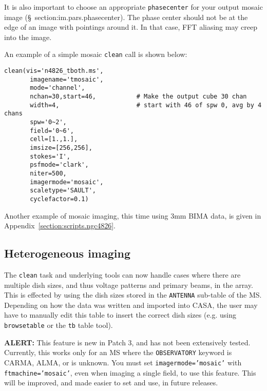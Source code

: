 It is also important to choose an appropriate {\tt phasecenter} for
your output mosaic image (\S~{section:im.pars.phasecenter}). The phase
center should not be at the edge of an image with pointings around
it. In that case, FFT aliasing may creep into the image. 


An example of a simple mosaic {\tt clean} call is shown below: 
\small
\begin{verbatim}
clean(vis='n4826_tboth.ms',        
       imagename='tmosaic',         
       mode='channel',
       nchan=30,start=46,           # Make the output cube 30 chan
       width=4,                     # start with 46 of spw 0, avg by 4 chans
       spw='0~2',
       field='0~6',
       cell=[1.,1.],
       imsize=[256,256],
       stokes='I',
       psfmode='clark',
       niter=500,
       imagermode='mosaic',
       scaletype='SAULT',
       cyclefactor=0.1)
\end{verbatim}
\normalsize

Another example of mosaic imaging, this time using 3mm BIMA data,
is given in Appendix~\ref{section:scripts.ngc4826}.

\subsection{Heterogeneous imaging}
\label{section:im.clean.hetero}

The {\tt clean} task and underlying tools can now handle cases where
there are multiple dish sizes, and thus voltage patterns and primary
beams, in the array.  This is effected by using the dish sizes stored
in the {\tt ANTENNA} sub-table of the MS.  Depending on how the data
was written and imported into CASA, the user may have to manually edit
this table to insert the correct dish sizes (e.g. using {\tt
browsetable} or the {\tt tb} table tool).  

{\bf ALERT:} This feature is new in Patch 3, and has not been
extensively tested.  Currently, this works only for an MS where the
{\tt OBSERVATORY} keyword is CARMA, ALMA, or is unknown.  You must
set {\tt imagermode='mosaic'} with {\tt ftmachine='mosaic'}, even
when imaging a single field, to use this feature.
This will be improved, and made easier to set and use, in future
releases.  

